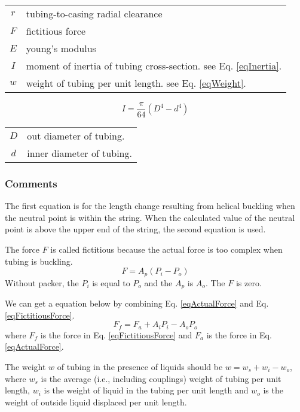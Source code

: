 \documentclass{article}
\begin{document}
\begin{center}
\begin{tabular}{c l}
$r$ & tubing-to-casing radial clearance \\
$F$ & fictitious force \\
$E$ & young's modulus \\
$I$ & moment of inertia of tubing cross-section. see Eq. \ref{eqInertia}. \\
$w$ & weight of tubing per unit length. see Eq. \ref{eqWeight}. \\
\end{tabular}
\end{center}

\begin{equation} \label{eqInertia}
I=\frac{\pi}{64}(D^4 - d^4)
\end{equation}
\begin{center}
\begin{tabular}{c l}
$D$ & out diameter of tubing. \\
$d$ & inner diameter of tubing. \\
\end{tabular}
\end{center}

\subsubsection{Comments}
The first equation is for the length change resulting from helical buckling
when the neutral point is within the string. When the calculated value of the
neutral point is above the upper end of the string, the second equation is
used.

The force $F$ is called fictitious because the actual force is too complex
when tubing is buckling. 
\begin{equation}\label{eqFictitiousForce}
F = A_p(P_i - P_o)
\end{equation}
 Without packer, the $P_i$ is equal to $P_o$ and the $A_p$ is $A_o$. The $F$
 is zero.

We can get a equation below by combining Eq. \ref{eqActualForce} and
Eq. \ref{eqFictitiousForce}.
\begin{equation}\label{eqA2F}
F_f = F_a + A_iP_i - A_oP_o
\end{equation}
where $F_f$ is the force in Eq. \ref{eqFictitiousForce} and $F_a$ is the force
in Eq. \ref{eqActualForce}.

The weight $w$ of tubing in the presence of liquids should be $w = w_s + w_i -
w_o$, where $w_s$ is the average (i.e., including couplings) weight of tubing
per unit length, $w_i$ is the weight of liquid in the tubing per unit length
and $w_o$ is the weight of outside liquid displaced per unit length.
\end{document}
